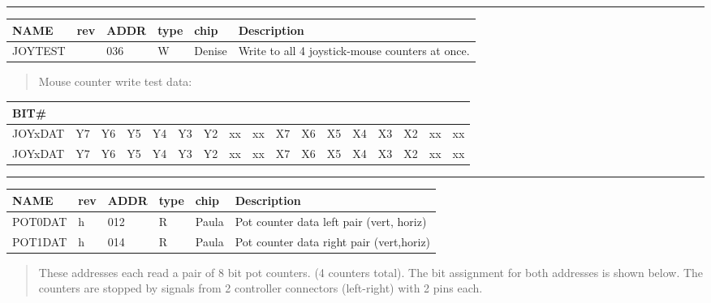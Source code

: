 \documentclass[a4paper,8pt,english]{sphinxmanual}
\begin{document}
\bigskip\hrule{}\bigskip


\begin{tabulary}{\linewidth}{|L|L|L|L|L|L|}
\hline
\textsf{\relax 
NAME
} & \textsf{\relax 
rev
} & \textsf{\relax 
ADDR
} & \textsf{\relax 
type
} & \textsf{\relax 
chip
} & \textsf{\relax 
Description
}\\
\hline
JOYTEST
 &  & 
036
 & 
W
 & 
Denise
 & 
Write to all 4  joystick-mouse counters at once.
\\
\hline\end{tabulary}

\begin{quote}

Mouse counter write test data:
\end{quote}

\begin{tabulary}{\linewidth}{|L|L|L|L|L|L|L|L|L|L|L|L|L|L|L|L|L|}
\hline
\textsf{\relax 
BIT\#
} & \textsf{
} & \textsf{
} & \textsf{
} & \textsf{
} & \textsf{
} & \textsf{
} & \textsf{
} & \textsf{
} & \textsf{
} & \textsf{
} & \textsf{
} & \textsf{
} & \textsf{
} & \textsf{
} & \textsf{
} & \textsf{
}\\
\hline
JOYxDAT
 & 
Y7
 & 
Y6
 & 
Y5
 & 
Y4
 & 
Y3
 & 
Y2
 & 
xx
 & 
xx
 & 
X7
 & 
X6
 & 
X5
 & 
X4
 & 
X3
 & 
X2
 & 
xx
 & 
xx
\\
\hline
JOYxDAT
 & 
Y7
 & 
Y6
 & 
Y5
 & 
Y4
 & 
Y3
 & 
Y2
 & 
xx
 & 
xx
 & 
X7
 & 
X6
 & 
X5
 & 
X4
 & 
X3
 & 
X2
 & 
xx
 & 
xx
\\
\hline\end{tabulary}



\bigskip\hrule{}\bigskip


\begin{tabulary}{\linewidth}{|L|L|L|L|L|L|}
\hline
\textsf{\relax 
NAME
} & \textsf{\relax 
rev
} & \textsf{\relax 
ADDR
} & \textsf{\relax 
type
} & \textsf{\relax 
chip
} & \textsf{\relax 
Description
}\\
\hline
POT0DAT
 & 
h
 & 
012
 & 
R
 & 
Paula
 & 
Pot counter data left pair (vert, horiz)
\\
\hline
POT1DAT
 & 
h
 & 
014
 & 
R
 & 
Paula
 & 
Pot counter data right pair (vert,horiz)
\\
\hline\end{tabulary}

\begin{quote}

These addresses each read a pair of 8 bit pot counters.
(4 counters total). The bit assignment for both
addresses is shown below. The counters are stopped by signals
from 2 controller connectors (left-right) with 2 pins each.
\end{quote}
\end{document}
